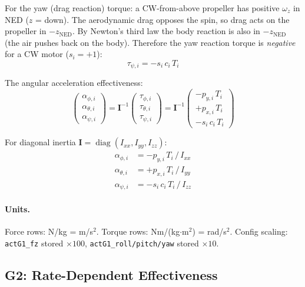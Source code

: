 \documentclass[11pt]{article}
\newcommand{\ned}{\mathrm{NED}}
\newcommand{\diag}{\operatorname{diag}}
\begin{document}
For the yaw (drag reaction) torque: a CW-from-above propeller has positive
$\omega_z$ in NED ($z$ = down). The aerodynamic drag opposes the spin, so
drag acts on the propeller in $-z_\ned$.  By Newton's third law the body
reaction is also in $-z_\ned$ (the air pushes back on the body).
Therefore the yaw reaction torque is \emph{negative} for a CW motor ($s_i = +1$):
\begin{equation}
    \tau_{\psi,i} = -s_i \, c_i \, T_i
\end{equation}

The angular acceleration effectiveness:
\begin{equation}\label{eq:g1_alpha_ned}
    \begin{pmatrix} \alpha_{\phi,i} \\ \alpha_{\theta,i} \\ \alpha_{\psi,i} \end{pmatrix}
    = \bm{I}^{-1} \begin{pmatrix} \tau_{\phi,i} \\ \tau_{\theta,i} \\ \tau_{\psi,i} \end{pmatrix}
    = \bm{I}^{-1} \begin{pmatrix} -p_{y,i} \, T_i \\ +p_{x,i} \, T_i \\ -s_i \, c_i \, T_i \end{pmatrix}
\end{equation}

For diagonal inertia $\bm{I} = \diag(I_{xx}, I_{yy}, I_{zz})$:
\begin{align}
    \alpha_{\phi,i}   &= -p_{y,i} \, T_i \,/\, I_{xx} \\
    \alpha_{\theta,i} &= +p_{x,i} \, T_i \,/\, I_{yy} \\
    \alpha_{\psi,i}   &= -s_i \, c_i \, T_i \,/\, I_{zz}
\end{align}

\paragraph{Units.} Force rows: N/kg = m/s$^2$. Torque rows: Nm/(kg$\cdot$m$^2$) = rad/s$^2$.
Config scaling: \texttt{actG1\_fz} stored $\times 100$, \texttt{actG1\_roll/pitch/yaw} stored $\times 10$.

\subsection{G2: Rate-Dependent Effectiveness}
\end{document}
